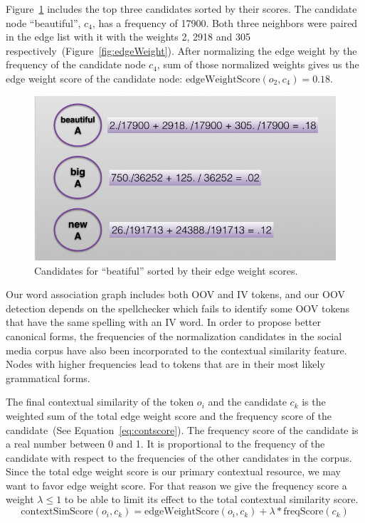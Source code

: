 \documentclass[a4paper,onesided,12pt]{report}
\begin{document}
Figure~\ref{fig:contextscores} includes the top three candidates sorted by their scores. The candidate node ``beautiful'', $c_4$, has a frequency of 17900. Both three neighbors were paired in the edge list with it with the weights 2, 2918 and 305 respectively~(Figure~\ref{fig:edgeWeight}). After normalizing the edge weight by the frequency of the candidate node  $c_4$, sum of those normalized weights gives us the edge weight score of the candidate node: $\text{edgeWeightScore}(o_2,c_4) = 0.18$.

\begin{figure}[htb]
\begin{center}
\includegraphics[scale=0.5]{fig/contextScores}
\caption{Candidates for ``beatiful'' sorted by their edge weight scores.}
\label{fig:contextscores}
\end{center}
\end{figure}

Our word association graph includes both OOV and IV tokens, and our OOV detection depends on the spellchecker which fails to identify some OOV tokens that have the same spelling with an IV word. In order to propose better canonical forms, the frequencies of the normalization candidates in the social media corpus have also been incorporated to the contextual similarity feature. Nodes with higher frequencies lead to tokens that are in their most likely grammatical forms.

The final contextual similarity of the token $o_i$ and the candidate $c_k$ is the weighted sum of the total edge weight score and the frequency score of the candidate~(See Equation~\ref{eq:contscore}). The frequency score of the candidate is a real number between 0 and 1. It is proportional to the frequency of the candidate with respect to the frequencies of the other candidates in the corpus. Since the total edge weight score is our primary contextual resource, we may want to favor edge weight score. For that reason we give the frequency score a weight $\lambda \leq 1$ to be able to limit its effect to the total contextual similarity score.
\begin{equation}
\text{contextSimScore}(o_i,c_k) = \text{edgeWeightScore}(o_i,c_k) + \lambda * \text{freqScore}(c_k)
\label{eq:contscore}
\end{equation}
\end{document}
